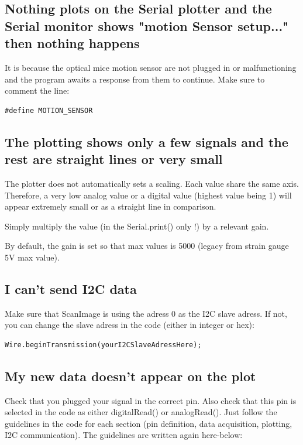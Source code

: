 \documentclass[a4paper]{article}
\begin{document}
\subsection{Nothing plots on the Serial plotter and the Serial monitor shows "motion Sensor setup..." then nothing happens}
It is because the optical mice motion sensor are not plugged in or malfunctioning and the program awaits a response from them to continue.
Make sure to comment the line:
\begin{lstlisting}
#define MOTION_SENSOR
\end{lstlisting}

\subsection{The plotting shows only a few signals and the rest are straight lines or very small}
The plotter does not automatically sets a scaling. Each value share the same axis. Therefore, a very low analog value or a digital value (highest value being 1) will appear extremely small or as a straight line in comparison.

Simply multiply the value (in the Serial.print() only !) by a relevant gain.

By default, the gain is set so that max values is 5000 (legacy from strain gauge 5V max value).

\subsection{I can't send I2C data}
Make sure that ScanImage is using the adress 0 as the I2C slave adress.
If not, you can change the slave adress in the code (either in integer or hex):
\begin{lstlisting}
Wire.beginTransmission(yourI2CSlaveAdressHere);
\end{lstlisting}


\subsection{My new data doesn't appear on the plot}
Check that you plugged your signal in the correct pin. Also check that this pin is selected in the code as either digitalRead() or analogRead(). Just follow the guidelines in the code for each section (pin definition, data acquisition, plotting, I2C communication). The guidelines are written again here-below:
\end{document}
